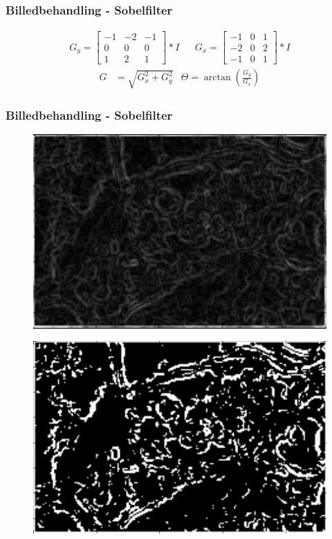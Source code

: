 \documentclass[12pt,t]{beamer}
\begin{document}
\begin{frame}
\frametitle{Billedbehandling - Sobelfilter}
\begin{align*}
	G_y = \begin{bmatrix}
		-1 & -2 & -1\\
		0 & 0 & 0\\
		1 & 2 & 1
	\end{bmatrix} * I
	&&
	G_x = \begin{bmatrix}
		-1 & 0 & 1\\
		-2 & 0 & 2\\
		-1 & 0 & 1
	\end{bmatrix} * I
	\end{align*}
\begin{align*}
	G &= \sqrt{G_x^2 + G_y^2}
	&\Theta = \arctan\left(\frac{G_y}{G_x}\right)
\end{align*}
\end{frame}

\begin{frame}
\frametitle{Billedbehandling - Sobelfilter}
\begin{figure}[H]
	\centering
	\includegraphics[scale=0.4]{../files/premethod/img/sobel3.png}
\end{figure}
\begin{figure}[H]
	\centering
	\includegraphics[scale=0.4]{../files/premethod/img/edgemap2.png}
\end{figure}
\end{frame}
\end{document}
